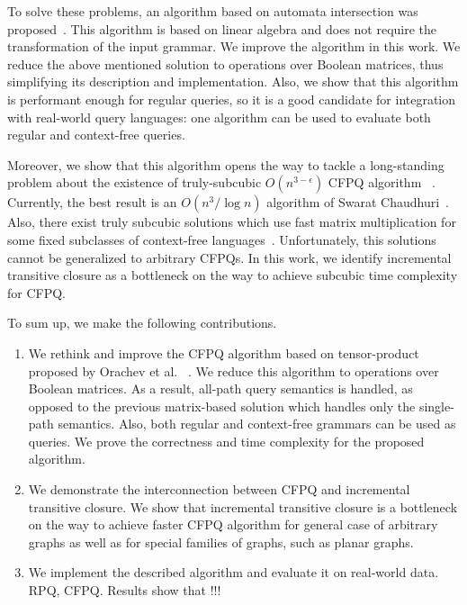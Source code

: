 To solve these problems, an algorithm based on automata intersection was proposed~\cite{10.1007/978-3-030-54832-2_6}.
This algorithm is based on linear algebra and does not require the transformation of the input grammar.
We improve the algorithm in this work.
We reduce the above mentioned solution to operations over Boolean matrices, thus simplifying its description and implementation.
Also, we show that this algorithm is performant enough for regular queries, so it is a good candidate for integration with real-world query languages: one algorithm can be used to evaluate both regular and context-free queries.

Moreover, we show that this algorithm opens the way to tackle a long-standing problem about the existence of truly-subcubic $O(n^{3-\epsilon})$ CFPQ algorithm ~\cite{10.1145/1328438.1328460, Yannakakis}.
Currently, the best result is an $O(n^3/\log{n})$ algorithm of Swarat Chaudhuri~\cite{10.1145/1328438.1328460}.
Also, there exist truly subcubic solutions which use fast matrix multiplication for some fixed subclasses of context-free languages~\cite{8249039}.
Unfortunately, this solutions cannot be generalized to arbitrary CFPQs.
In this work, we identify incremental transitive closure as a bottleneck on the way to achieve subcubic time complexity for CFPQ.

To sum up, we make the following contributions.
\begin{enumerate}
	\item We rethink and improve the CFPQ algorithm based on tensor-product proposed by Orachev et al. ~\cite{10.1007/978-3-030-54832-2_6}.
	We reduce this algorithm to operations over Boolean matrices.
	As a result, all-path query semantics is handled, as opposed to the previous matrix-based solution which handles only the single-path semantics.
	Also, both regular and context-free grammars can be used as queries.
	We prove the correctness and time complexity for the proposed algorithm.
	\item We demonstrate the interconnection between CFPQ and incremental transitive closure.
	We show that incremental transitive closure is a bottleneck on the way to achieve faster CFPQ algorithm for general case of arbitrary graphs as well as for special families of graphs, such as planar graphs.
	\item We implement the described algorithm and evaluate it on real-world data. RPQ, CFPQ. Results show that !!!
\end{enumerate}
